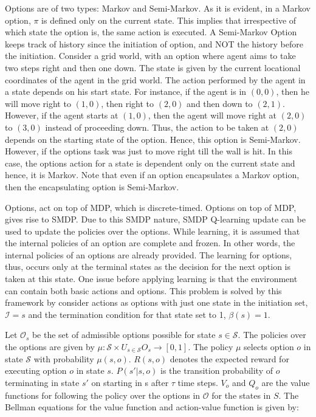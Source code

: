 Options are of two types: Markov and Semi-Markov. As it is evident, in a Markov option, \(\pi\) is defined only on the current state. This implies that irrespective of which state the option is, the same action is executed. A Semi-Markov Option keeps track of history since the initiation of option, and NOT the history before the initiation. Consider a grid world, with an option where agent aims to take two steps right and then one down. The state is given by the current locational coordinates of the agent in the grid world. The action performed by the agent in a state depends on his start state. For instance, if the agent is in \((0,0)\), then he will move right to \((1,0)\), then right to \((2,0)\) and then down to \((2,1)\). However, if the agent starts at \((1,0)\), then the agent will move right at \((2,0)\) to \((3,0)\) instead of proceeding down. Thus, the action to be taken at \((2,0)\) depends on the starting state of the option. Hence, this option is Semi-Markov. However, if the options task was just to move right till the wall is hit. In this case, the options action for a state is dependent only on the current state and hence, it is Markov. Note that even if an option encapsulates a Markov option, then the encapsulating option is Semi-Markov. 

Options, act on top of MDP, which is discrete-timed. Options on top of MDP, gives rise to SMDP. Due to this SMDP nature, SMDP Q-learning update can be used to update the policies over the options. While learning, it is assumed that the internal policies of an option are complete and frozen. In other words, the internal policies of an options are already provided. The learning for options, thus, occurs only at the terminal states as the decision for the next option is taken at this state. One issue before applying learning is that the environment can contain both basic actions and options. This problem is solved by this framework by consider actions as options with just one state in the initiation set, \(\mathcal{I}=s\) and the termination condition for that state set to 1, \(\beta(s)=1\). 

Let \(\mathcal{O}_s\) be the set of admissible options possible for state \(s \in \mathcal{S}\). The policies over the options are given by \(\mu:\mathcal{S} \times U_{s \in \mathcal{S}} O_s \rightarrow [0,1]\). The policy \(\mu\) selects option \(o\) in state \(\mathcal{S}\) with probability \(\mu(s,o)\). \(R(s,o)\) denotes the expected reward for executing option \(o\) in state \(s\). \(P(s' |s,o)\) is the transition probability of \(o\) terminating in state \(s'\) on starting in s after \(\tau\) time steps. \(V_o\) and \(Q_o\) are the value functions for following the policy over the options in \(\mathcal{O}\) for the states in \(S\). The Bellman equations for the value function and action-value function is given by: 

